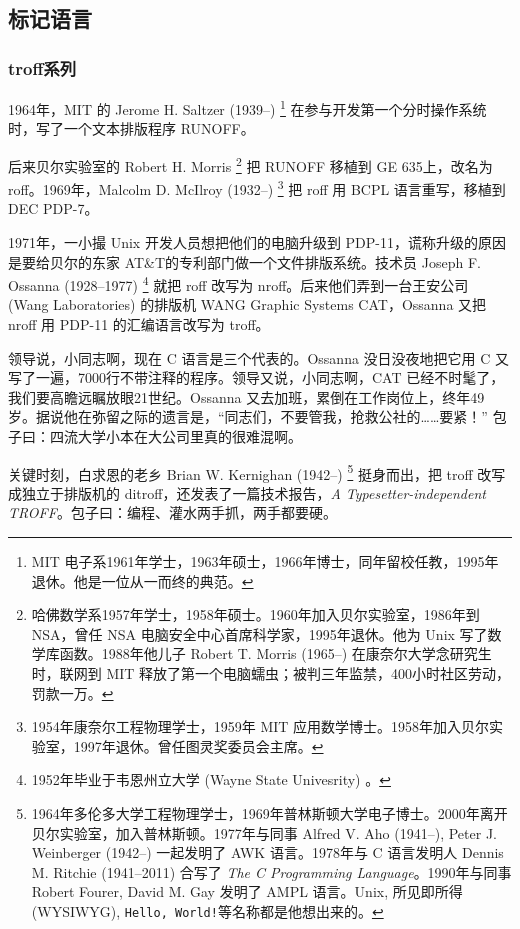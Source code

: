 \subsection{标记语言}

\subsubsection{troff系列}

1964年，MIT 的 Jerome H. Saltzer (1939--)\indexSaltzer{} \footnote{MIT 电子系1961年学士，1963年硕士，1966年博士，同年留校任教，1995年退休。他是一位从一而终的典范。} 在参与开发第一个分时操作系统时，写了一个文本排版程序 RUNOFF。

后来贝尔实验室\indexBell 的 Robert H. Morris\indexMorris{} \footnote{哈佛数学系1957年学士，1958年硕士。1960年加入贝尔实验室，1986年到 NSA，曾任 NSA 电脑安全中心首席科学家，1995年退休。他为 Unix 写了数学库函数。1988年他儿子 Robert T. Morris (1965--) 在康奈尔大学念研究生时，联网到 MIT 释放了第一个电脑蠕虫；被判三年监禁，400小时社区劳动，罚款一万。} 把 RUNOFF 移植到 GE 635上，改名为 roff。1969年，Malcolm D. McIlroy (1932--)\indexMcIlroy{} \footnote{1954年康奈尔工程物理学士，1959年 MIT 应用数学博士。1958年加入贝尔实验室，1997年退休。曾任图灵奖委员会主席。} 把 roff 用 BCPL 语言重写，移植到 DEC\indexDEC{} PDP-7。

1971年，一小撮 Unix 开发人员想把他们的电脑升级到 PDP-11，谎称升级的原因是要给贝尔的东家 AT\&T\indexATT 的专利部门做一个文件排版系统。技术员 Joseph F. Ossanna (1928--1977)\indexOssanna{} \footnote{1952年毕业于韦恩州立大学 (Wayne State Univesrity) 。} 就把 roff 改写为 nroff。后来他们弄到一台王安公司 (Wang Laboratories)\indexWangLabs{} 的排版机 WANG Graphic Systems CAT，Ossanna 又把 nroff 用 PDP-11 的汇编语言改写为 troff。

领导说，小同志啊，现在 C 语言是三个代表的。Ossanna 没日没夜地把它用 C 又写了一遍，7000行不带注释的程序。领导又说，小同志啊，CAT 已经不时髦了，我们要高瞻远瞩放眼21世纪。Ossanna 又去加班，累倒在工作岗位上，终年49岁。据说他在弥留之际的遗言是，“同志们，不要管我，抢救公社的……要紧！” 包子曰：四流大学小本在大公司里真的很难混啊。

关键时刻，白求恩的老乡 Brian W. Kernighan (1942--)\indexKernighan{} \footnote{1964年多伦多大学工程物理学士，1969年普林斯顿大学电子博士。2000年离开贝尔实验室，加入普林斯顿。1977年与同事 Alfred V. Aho (1941--), Peter J. Weinberger (1942--) 一起发明了 AWK 语言。1978年与 C 语言发明人 Dennis M. Ritchie (1941--2011) 合写了 \emph{The C Programming Language}。1990年与同事 Robert Fourer, David M. Gay 发明了 AMPL 语言。Unix, 所见即所得 (WYSIWYG), \texttt{Hello, World!}等名称都是他想出来的。} 挺身而出，把 troff 改写成独立于排版机的 ditroff，还发表了一篇技术报告，\emph{A Typesetter-independent TROFF}。包子曰：编程、灌水两手抓，两手都要硬。

